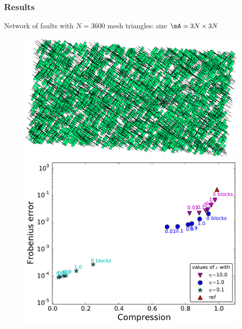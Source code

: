 \begin{frame}
\frametitle{Results}

\small

Network of \alert{faults} with $N=3600$ mesh triangles: size $\mA=3N\times 3N$
\vspace{-5pt}
\begin{figure}
\centering
\begin{minipage}[c]{.49\linewidth}
\includegraphics[width=\textwidth]{../images/visu_maillage3600FracsV2DN2.png}
\end{minipage}
\begin{minipage}[c]{.49\linewidth}
\includegraphics[width=\textwidth]{../images/graphe_compasparse_output_compression_18_08_2016matrice3600FracsV2DN2.pdf}
\end{minipage}
\end{figure}

\end{frame}

